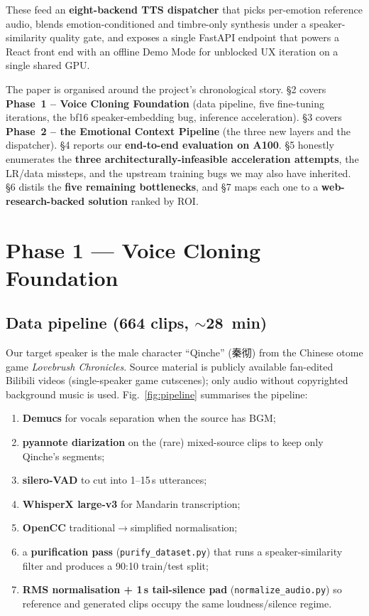 \documentclass[10pt,a4paper]{article}
\begin{document}
These feed an \textbf{eight-backend TTS dispatcher} that picks per-emotion
reference audio, blends emotion-conditioned and timbre-only synthesis under
a speaker-similarity quality gate, and exposes a single FastAPI endpoint
that powers a React front end with an offline Demo Mode for unblocked UX
iteration on a single shared GPU.

The paper is organised around the project's chronological story. \S2 covers
\textbf{Phase~1 -- Voice Cloning Foundation} (data pipeline, five fine-tuning
iterations, the bf16 speaker-embedding bug, inference acceleration). \S3
covers \textbf{Phase~2 -- the Emotional Context Pipeline} (the three new
layers and the dispatcher). \S4 reports our \textbf{end-to-end evaluation on
A100}. \S5 honestly enumerates the \textbf{three architecturally-infeasible
acceleration attempts}, the LR/data missteps, and the upstream training
bugs we may also have inherited. \S6 distils the \textbf{five remaining
bottlenecks}, and \S7 maps each one to a \textbf{web-research-backed
solution} ranked by ROI.

\section{Phase 1 --- Voice Cloning Foundation}

\subsection{Data pipeline (664 clips, $\sim$28~min)}

Our target speaker is the male character ``Qinche'' (秦彻) from the Chinese
otome game \emph{Lovebrush Chronicles}. Source material is publicly available
fan-edited Bilibili videos (single-speaker game cutscenes); only audio
without copyrighted background music is used. Fig.~\ref{fig:pipeline}
summarises the pipeline:

\begin{enumerate}
  \item \textbf{Demucs} for vocals separation when the source has BGM;
  \item \textbf{pyannote diarization} on the (rare) mixed-source clips to
        keep only Qinche's segments;
  \item \textbf{silero-VAD} to cut into 1--15\,s utterances;
  \item \textbf{WhisperX large-v3} for Mandarin transcription;
  \item \textbf{OpenCC} traditional$\to$simplified normalisation;
  \item a \textbf{purification pass} (\texttt{purify\_dataset.py})
        that runs a speaker-similarity filter and produces a 90:10
        train/test split;
  \item \textbf{RMS normalisation + 1\,s tail-silence pad}
        (\texttt{normalize\_audio.py}) so reference and generated
        clips occupy the same loudness/silence regime.
\end{enumerate}
\end{document}
